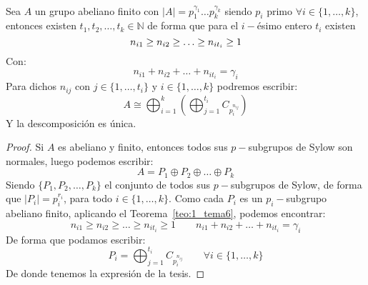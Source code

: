 \begin{teo}\label{teo:2_tema6}\ \\
    Sea $A$ un grupo abeliano finito con $|A| = p_1^{\gamma_1}\ldots p_k^{\gamma_k}$ siendo $p_i$ primo $\forall i \in \{1,\ldots,k\}$, entonces existen $t_1,t_2,\ldots, t_k\in \mathbb{N}$ de forma que para el $i-$ésimo entero $t_i$ existen
    \begin{equation*}
        n_{i1} \geq n_{i2} \geq \ldots \geq n_{it_{i}} \geq 1 \\
    \end{equation*}
    Con:
    \begin{equation*}
        n_{i1} + n_{i2} + \ldots + n_{it_{i}} = \gamma_i
    \end{equation*}
    Para dichos $n_{ij}$ con $j \in \{1,\ldots, t_i\}$ y $i \in \{1,\ldots,k\}$ podremos escribir:
    \begin{equation*}
        A \cong \bigoplus_{i=1}^k \left(\bigoplus_{j=1}^{t_i} C_{p_i^{n_{ij}}}\right)
    \end{equation*}
    Y la descomposición es única.
    \begin{proof}
        Si $A$ es abeliano y finito, entonces todos sus $p-$subgrupos de Sylow son normales, luego podemos escribir:
        \begin{equation*}
            A = P_1 \oplus P_2 \oplus \ldots \oplus P_k
        \end{equation*}
        Siendo $\{P_1, P_2, \ldots, P_k\}$ el conjunto de todos sus $p-$subgrupos de Sylow, de forma que $|P_i| = p_i^{r_i}$, para todo $i \in \{1,\ldots,k\}$. Como cada $P_i$ es un $p_i-$subgrupo abeliano finito, aplicando el Teorema~\ref{teo:1_tema6}, podemos encontrar:
        \begin{equation*}
            n_{i1} \geq n_{i2} \geq \ldots \geq n_{it_{i}} \geq 1 \qquad 
            n_{i1} + n_{i2} + \ldots + n_{it_{i}} = \gamma_i
        \end{equation*}
        De forma que podamos escribir:
        \begin{equation*}
            P_i = \bigoplus_{j=1}^{t_i} C_{p_i^{n_{ij}}} \qquad \forall i \in \{1,\ldots,k\}
        \end{equation*}
        De donde tenemos la expresión de la tesis.
    \end{proof}
\end{teo}

